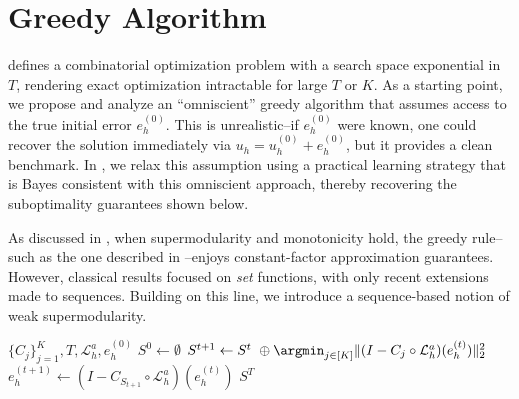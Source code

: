 \documentclass{article} %
\begin{document}


\section{Greedy Algorithm} \label{sec:greedy}

 defines a combinatorial optimization problem with a search space exponential in $T$, rendering exact optimization intractable for large $T$ or $K$. As a starting point, we propose and analyze an ``omniscient'' greedy algorithm that assumes access to the true initial error $e^{(0)}_h$. This is unrealistic--if $e^{(0)}_h$ were known, one could recover the solution immediately via $u_h = u^{(0)}_h + e^{(0)}_h$, but it provides a clean benchmark.
In , we relax this assumption using a practical learning strategy that is Bayes consistent with this omniscient approach, thereby recovering the suboptimality guarantees shown below.

As discussed in , when supermodularity and monotonicity hold, the greedy rule--such as the one described in --enjoys constant-factor approximation guarantees. However, classical results focused on \textit{set} functions, with only recent extensions made to sequences. Building on this line, we introduce a sequence-based notion of weak supermodularity.

\begin{algorithm} 
\caption{Greedy Algorithm for a Hybrid PDE solver}\label{alg:greedy}
\begin{algorithmic}
\Require $\{C_{j}\}_{j = 1}^{K}, T, \mathcal{L}_h^a, e^{(0)}_h$
\State $S^{0} \gets \emptyset$
    \State $S^{t + 1} \gets S^{t} \ \oplus \argmin_{j \in [K]}\|( I - C_{j} \circ \mathcal{L}_{h}^a)(e^{(t)}_h)\|^2_2$
    \State $e^{(t + 1)}_h \gets (I - C_{S_{t+ 1}} \circ \mathcal{L}_{h}^a) (e^{(t)}_h)$
\EndFor
\State \Return $S^{T}$
\end{algorithmic}
\end{algorithm}
\end{document}
